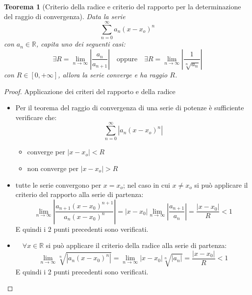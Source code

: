 \documentclass[12pt, a4paper]{article}
\theoremstyle{break}
\newtheorem{theorem}{Teorema} %
\begin{document}
\newpage
\begin{theorem} [Criterio della radice e criterio del rapporto per la
		determinazione del raggio di convergenza]
	Data la serie
	\[
		\sum_{n=0}^{\infty} a_n (x - x_o)^n
	\]
	con $a_n \in \mathbb{R}$, capita uno dei seguenti casi:
	\[
		\exists R = \lim_{n \to \infty} \left| \frac{a_n}{a_{n+1}}
		\right|   \quad \text{oppure} \quad
		\exists R = \lim_{n \to \infty} \left| \frac{1}{\sqrt[n]{a_n}}
		\right|
	\]
	con $R \in [0,+\infty]$, allora la serie converge e ha raggio $R$.
\end{theorem}
\begin{proof} Applicazione dei criteri del rapporto e della radice
	\begin{itemize}
		\item Per il teorema del raggio di convergenza di una serie di potenze
		      è sufficiente verificare che:
		      \[
			      \sum_{n=0}^{\infty} \left| a_n (x - x_o)^n \right|
		      \]
		      \begin{itemize}
			      \item converge per $|x - x_o| < R$
			      \item non converge per $|x - x_o| > R$
		      \end{itemize}
		\item tutte le serie convergono per $x = x_o$; nel caso in cui $x \neq
			      x_o$ si può applicare il criterio del rapporto alla serie di
		      partenza:
		      \[
			      \lim_{n \to \infty} \left| \frac{a_{n+1}(x-x_0)^{n+1}}
			      {a_n (x-x_0)^n} \right| = \left| x - x_0 \right| \lim_{n
				      \to \infty} \left| \frac{a_{n+1}}{a_n} \right| =
			      \frac{\left| x -
				      x_0 \right|}{R} < 1
		      \]
		      E quindi i 2 punti precedenti sono verificati.
		\item $\quad \forall x \in \mathbb{R} $ si può applicare il criterio
		      della radice alla serie di partenza:
		      \[
			      \lim_{n \to \infty} \sqrt[n]{\left| a_n (x-x_0)^n
				      \right|} = \lim_{n \to \infty} \left| x - x_0 \right|
			      \sqrt[n]{\left| a_n \right|} = \frac{\left| x - x_0 \right|}
			      {R} < 1
		      \]
		      E quindi i 2 punti precedenti sono verificati.
	\end{itemize}
\end{proof}
\end{document}
